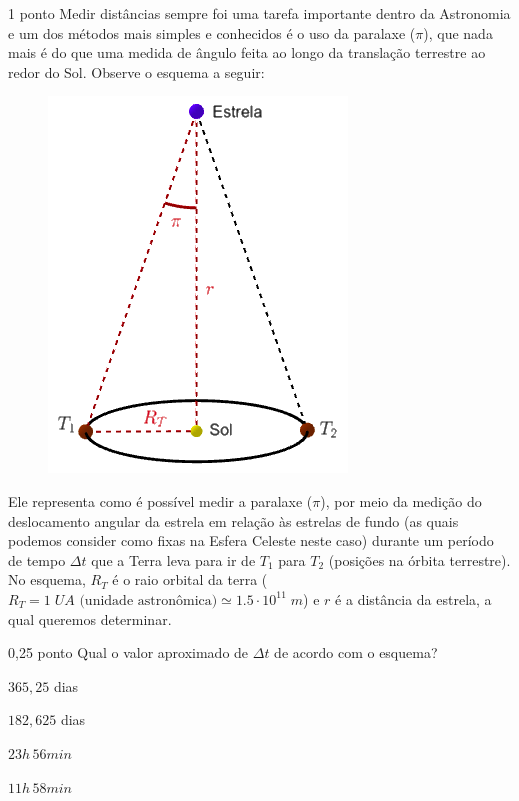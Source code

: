 \documentclass{../lista}
\begin{document}

	\begin{questao}{1 ponto}
		Medir distâncias sempre foi uma tarefa importante dentro da Astronomia e um dos métodos mais simples e conhecidos é o uso da paralaxe ($\pi$), que nada mais é do que uma medida de ângulo feita ao longo da translação terrestre ao redor do Sol. Observe o esquema a seguir:
		\begin{figure}[H]
			\centering
			\includegraphics[scale=0.7]{./img/1.png}
		\end{figure}
		Ele representa como é possível medir a paralaxe ($\pi$), por meio da medição do deslocamento angular da estrela em relação às estrelas de fundo (as quais podemos consider como fixas na Esfera Celeste neste caso) durante um período de tempo $\Delta t$ que a Terra leva para ir de $T_1$ para $T_2$ (posições na órbita terrestre). No esquema, $R_T$ é o raio orbital da terra ($R_T = 1 \; UA \textrm{ (unidade astronômica)} \simeq 1.5 \cdot 10^{11} \; m$) e $r$ é a distância da estrela, a qual queremos determinar.

		\begin{pergunta}{0,25 ponto}
			Qual o valor aproximado de $\Delta t$ de acordo com o esquema?

			\begin{alternativas}
				\item $365,25$ dias
				\item $182,625$ dias
				\item $23h \, 56min$
				\item $11h \, 58min$
			\end{alternativas}
		\end{pergunta}


\end{questao}
\end{document}
